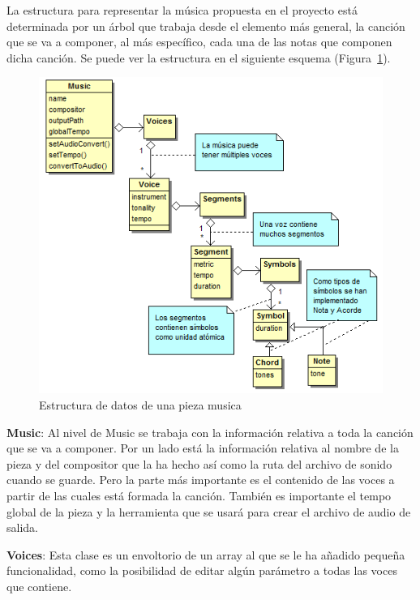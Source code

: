 
La estructura para representar la música propuesta en el proyecto está determinada por un árbol que trabaja desde el elemento más general, la canción que se va a componer, al más específico, cada una de las notas que componen dicha canción. Se puede ver la estructura en el siguiente esquema (Figura~\ref{fig:structmusic}).\\
	
	\begin{figure}[htbp]
	\centering
	\hspace*{-0.1in}
	\includegraphics[scale=0.6]{graphics/musica-estructura.png}
	\caption{Estructura de datos de una pieza musica}
	\label{fig:structmusic}
	\end{figure}


\textbf{Music}: Al nivel de Music se trabaja con la información relativa a toda la canción que se va a componer. Por un lado está la información relativa al nombre de la pieza y del compositor que la ha hecho así como la ruta del archivo de sonido cuando se guarde. Pero la parte más importante es el contenido de las voces a partir de las cuales está formada la canción. También es importante el tempo global de la pieza y la herramienta que se usará para crear el archivo de audio de salida.
\newline

\textbf{Voices}: Esta clase es un envoltorio de un array al que se le ha añadido pequeña funcionalidad, como la posibilidad de editar algún parámetro a todas las voces que contiene.
\newline

